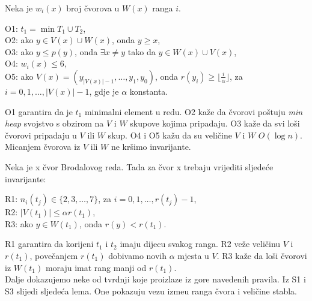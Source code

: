 \begin{defn}\label{O_inv}
  Neka je $w_{i}(x)$ broj \v{c}vorova u $W(x)$ ranga $i$.
  \begin{myindentpar}{15pt}
    O1: $t_{1} = \min T_{1} \cup T_{2}$, \\
    O2: ako $y \in V(x) \cup W(x)$, onda $y \ge x$, \\
    O3: ako $y \le p(y)$, onda $\exists x \ne y$ tako da $y \in W(x) \cup V(x)$, \\
    O4: $w_{i}(x) \le 6$, \\
    O5: ako $V(x) = (y_{|V(x)| - 1},\dotsc,y_{1},y_{0})$, onda $r(y_{i}) \ge \lfloor\frac{i}{\alpha}\rfloor$, za $i = 0,1,\dotsc,|V(x)| - 1$, gdje je $\alpha$ konstanta.
  \end{myindentpar}
\end{defn}

O1 garantira da je $t_{1}$ minimalni element u redu.
O2 ka\v{z}e da \v{c}vorovi po\v{s}tuju \emph{min heap} svojstvo s obzirom na $V$ i $W$ skupove kojima pripadaju.
O3 ka\v{z}e da svi lo\v{s}i \v{c}vorovi pripadaju u $V$ ili $W$ skup.
O4 i O5 ka\v{z}u da su veli\v{c}ine $V$ i $W$ $O(\log n)$.
Micanjem \v{c}vorova iz $V$ ili $W$ ne kr\v{s}imo invarijante.

\begin{defn}\label{R_inv}
  Neka je x \v{c}vor Brodalovog reda. Tada za \v{c}vor x trebaju vrijediti sljede\'{c}e invarijante:
  \begin{myindentpar}{15pt}
    R1: $n_{i}(t_{j}) \in \{2,3,\dotsc,7\}$, za $i = 0,1,\dotsc,r(t_{j}) - 1$,\\
    R2: $|V(t_{1})| \le \alpha r(t_{1})$, \\
    R3: ako $y \in W(t_{1})$, onda $r(y) < r(t_{1})$.
  \end{myindentpar}
\end{defn}

R1 garantira da korijeni $t_{1}$ i $t_{2}$ imaju dijecu svakog ranga.
R2 ve\v{z}e veli\v{c}inu $V$ i $r(t_{1})$, pove\v{c}anjem $r(t_{1})$ dobivamo novih $\alpha$ mjesta u $V$.
R3 ka\v{z}e da lo\v{s}i \v{c}vorovi iz $W(t_{1})$ moraju imat rang manji od $r(t_{1})$.\\
Dalje dokazujemo neke od tvrdnji koje proizlaze iz gore navedenih pravila.
Iz S1 i S3 slijedi sljede\'{c}a lema.
One pokazuju vezu izme\dj u ranga \v{c}vora i veli\v{c}ine stabla.

